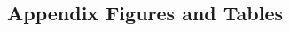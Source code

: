 \documentclass[11pt]{article}
\begin{document}
\begin{spacing}{1.5}
\begin{appendices}
  \clearpage
  \section{Appendix Figures and Tables}
    
  \end{appendices}
\end{spacing}
\end{document}
